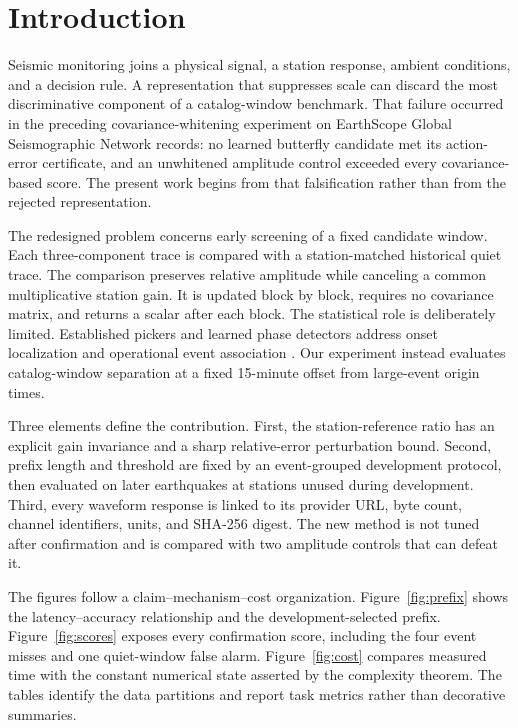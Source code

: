 \documentclass[10pt,letterpaper,twoside]{article}
\begin{document}
\section{Introduction}

Seismic monitoring joins a physical signal, a station response, ambient
conditions, and a decision rule.  A representation that suppresses scale can
discard the most discriminative component of a catalog-window benchmark.
That failure occurred in the preceding covariance-whitening experiment on
EarthScope Global Seismographic Network records: no learned butterfly
candidate met its action-error certificate, and an unwhitened amplitude
control exceeded every covariance-based score.  The present work begins from
that falsification rather than from the rejected representation.

The redesigned problem concerns early screening of a fixed candidate window.
Each three-component trace is compared with a station-matched historical
quiet trace.  The comparison preserves relative amplitude while canceling a
common multiplicative station gain.  It is updated block by block, requires no
covariance matrix, and returns a scalar after each block.  The statistical
role is deliberately limited.  Established pickers and learned phase
detectors address onset localization and operational event association
\cite{allen1978automatic,ross2018generalized,zhu2019phasenet}.  Our experiment
instead evaluates catalog-window separation at a fixed 15-minute offset from
large-event origin times.

Three elements define the contribution.  First, the station-reference ratio
has an explicit gain invariance and a sharp relative-error perturbation bound.
Second, prefix length and threshold are fixed by an event-grouped development
protocol, then evaluated on later earthquakes at stations unused during
development.  Third, every waveform response is linked to its provider URL,
byte count, channel identifiers, units, and SHA-256 digest.  The new method is
not tuned after confirmation and is compared with two amplitude controls that
can defeat it.

The figures follow a claim--mechanism--cost organization.  Figure~\ref{fig:prefix}
shows the latency--accuracy relationship and the development-selected prefix.
Figure~\ref{fig:scores} exposes every confirmation score, including the four
event misses and one quiet-window false alarm.  Figure~\ref{fig:cost} compares
measured time with the constant numerical state asserted by the complexity
theorem.  The tables identify the data partitions and report task metrics
rather than decorative summaries.
\end{document}
